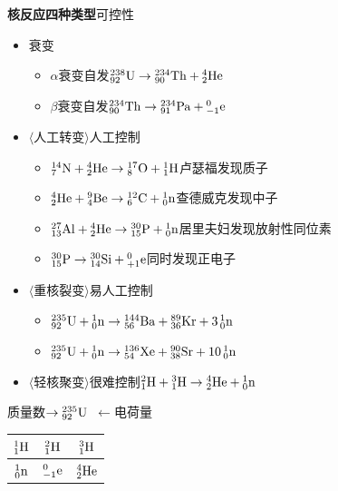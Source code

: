 \textbf{核反应四种类型}\quad 可控性 %
\begin{itemize}
\item 衰变
  \begin{itemize}
  \item $\alpha$衰变\quad 自发\quad ${}^{238}_{92}\mathrm{U}\to{}^{234}_{90}\mathrm{Th}+{}^{4}_{2}\mathrm{He}$
  \item $\beta$衰变\quad 自发\quad ${}^{234}_{90}\mathrm{Th}\to{}^{234}_{91}\mathrm{Pa}+{}^{0}_{-1}\mathrm{e}$
  \end{itemize}
\item $\langle$人工转变$\rangle$\quad 人工控制
  \begin{itemize}
  \item ${}^{14}_{7}\mathrm{N}+{}^{4}_{2}\mathrm{He}\to{}^{17}_{8}\mathrm{O}+{}^{1}_{1}\mathrm{H}$\quad 卢瑟福发现质子
  \item ${}^{4}_{2}\mathrm{He}+{}^{9}_{4}\mathrm{Be}\to{}^{12}_{6}\mathrm{C}+{}^{1}_{0}\mathrm{n}$\quad 查德威克发现中子
  \item ${}^{27}_{13}\mathrm{Al}+{}^{4}_{2}\mathrm{He}\to{}^{30}_{15}\mathrm{P}+{}^{1}_{0}\mathrm{n}$\quad 居里夫妇发现放射性同位素
  \item ${}^{30}_{15}\mathrm{P}\to{}^{30}_{14}\mathrm{Si}+{}^{0}_{+1}\mathrm{e}$\quad 同时发现正电子
  \end{itemize}
\item $\langle$重核裂变$\rangle$\quad 易人工控制
  \begin{itemize}
  \item ${}^{235}_{92}\mathrm{U}+{}^{1}_{0}\mathrm{n}\to{}^{144}_{56}\mathrm{Ba}+{}^{89}_{36}\mathrm{Kr}+3\,{}^{1}_{0}\mathrm{n}$
  \item ${}^{235}_{92}\mathrm{U}+{}^{1}_{0}\mathrm{n}\to{}^{136}_{54}\mathrm{Xe}+{}^{90}_{38}\mathrm{Sr}+10\,{}^{1}_{0}\mathrm{n}$
  \end{itemize}
\item $\langle$轻核聚变$\rangle$\quad 很难控制\quad ${}^{2}_{1}\mathrm{H}+{}^{3}_{1}\mathrm{H}\to{}^{4}_{2}\mathrm{He}+{}^{1}_{0}\mathrm{n}$
\end{itemize}

质量数$\to{}^{235}_{92}\mathrm{U}$\ $\leftarrow$电荷量 %

\begin{center}
{\renewcommand{\arraystretch}{1.6}
\begin{tabular}{|c|c|c|}
\hline
${}^{1}_{1}\mathrm{H}$ & ${}^{2}_{1}\mathrm{H}$ & ${}^{3}_{1}\mathrm{H}$ \\ \hline %
${}^{1}_{0}\mathrm{n}$ & ${}^{0}_{-1}\mathrm{e}$ & ${}^{4}_{2}\mathrm{He}$ \\ \hline
\end{tabular}}
\end{center}

